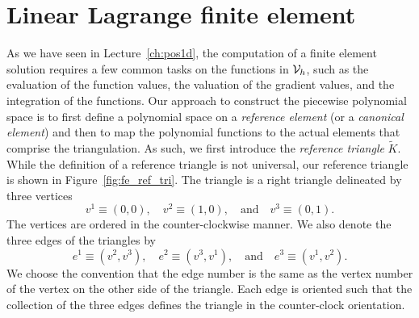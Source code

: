 
\section{Linear Lagrange finite element}
\label{sec:fe_lin_tri}


As we have seen in Lecture~\ref{ch:pos1d}, the computation of a finite element solution requires a few common tasks on the functions in $\mathcal{V}_h$, such as the evaluation of the function values, the valuation of the gradient values, and the integration of the functions.  Our approach to construct the piecewise polynomial space is to first define a polynomial space on a \emph{reference element} (or a \emph{canonical element}) and then to map the polynomial functions to the actual elements that comprise the triangulation.  As such, we first introduce the \emph{reference triangle} $\tilde K$.  While the definition of a reference triangle is not universal, our reference triangle is shown in Figure~\ref{fig:fe_ref_tri}.  The triangle is a right triangle delineated by three vertices
\begin{equation*}
  v^1 \equiv (0,0), \quad v^2 \equiv (1,0), \quad \text{and} \quad v^3 \equiv (0,1).
\end{equation*}
The vertices are ordered in the counter-clockwise manner. We also denote the three edges of the triangles by
\begin{equation*}
  e^1 \equiv (v^2,v^3), \quad e^2 \equiv (v^3,v^1), \quad \text{and} \quad e^3 \equiv (v^1,v^2).
\end{equation*}
We choose the convention that the edge number is the same as the vertex number of the vertex on the other side of the triangle. Each edge is oriented such that the collection of the three edges defines the triangle in the counter-clock orientation.  

